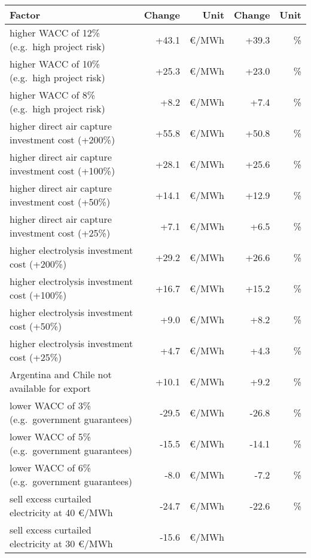 \begin{table*}
    \footnotesize
    \centering
    \begin{tabular}{lrrrr}
        \toprule
        Factor & Change & Unit & Change & Unit\\
        \midrule
        higher WACC of 12\% (e.g.~high project risk) & +43.1 & \euro{}/MWh  &
        +39.3 & \% \\
        higher WACC of 10\% (e.g.~high project risk) & +25.3 & \euro{}/MWh  &
        +23.0 & \% \\
        higher WACC of 8\% (e.g.~high project risk) & +8.2 & \euro{}/MWh  & +7.4
        & \% \\
        higher direct air capture investment cost (+200\%) & +55.8 & \euro{}/MWh
        & +50.8 & \% \\
        higher direct air capture investment cost (+100\%) & +28.1 & \euro{}/MWh
        & +25.6 & \% \\
        higher direct air capture investment cost (+50\%) & +14.1 & \euro{}/MWh
        & +12.9 & \% \\
        higher direct air capture investment cost (+25\%) & +7.1 & \euro{}/MWh &
        +6.5 & \% \\
        higher electrolysis investment cost (+200\%) & +29.2 & \euro{}/MWh  &
        +26.6 & \% \\
        higher electrolysis investment cost (+100\%) & +16.7 & \euro{}/MWh  &
        +15.2 & \% \\
        higher electrolysis investment cost (+50\%) & +9.0 & \euro{}/MWh  & +8.2
        & \% \\
        higher electrolysis investment cost (+25\%) & +4.7 & \euro{}/MWh  & +4.3
        & \% \\
        Argentina and Chile not available for export & +10.1 & \euro{}/MWh  &
        +9.2 & \% \\
        \midrule
        lower WACC of 3\% (e.g.~government guarantees) & -29.5 & \euro{}/MWh  &
        -26.8 & \% \\
        lower WACC of 5\% (e.g.~government guarantees) & -15.5 & \euro{}/MWh  &
        -14.1 & \% \\
        lower WACC of 6\% (e.g.~government guarantees) & -8.0 & \euro{}/MWh  &
        -7.2 & \% \\
        sell excess curtailed electricity at 40 \euro{}/MWh & -24.7 & \euro{}/MWh  &
        -22.6 & \% \\
        sell excess curtailed electricity at 30 \euro{}/MWh & -15.6 & \euro{}/MWh  &

\end{tabular}
\end{table*}
